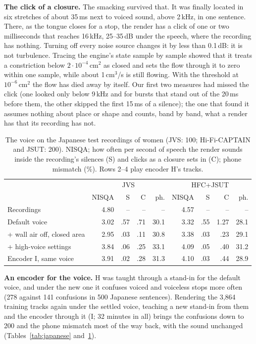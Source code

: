 \documentclass[10pt,a4paper,twocolumn]{article}
\begin{document}
\textbf{The click of a closure.} The smacking survived that. It was finally located in six
stretches of about 35\,ms next to voiced sound, above 2\,kHz, in one sentence. There, as the tongue
closes for a stop, the render has a click of one or two milliseconds that reaches 16\,kHz, 25--35\,dB
under the speech, where the recording has nothing. Turning off every noise source changes it by
less than 0.1\,dB: it is not turbulence. Tracing the engine's state sample by sample showed that
it treats a constriction below $2\cdot10^{-4}$\,cm$^2$ as closed and sets the flow through it to
zero within one sample, while about 1\,cm$^3$/s is still flowing. With the threshold at
$10^{-6}$\,cm$^2$ the flow has died away by itself. Our first two measures had missed the click
(one looked only below 9\,kHz and for bursts that stand out of the 20\,ms before them, the other
skipped the first 15\,ms of a silence); the one that found it assumes nothing about place or
shape and counts, band by band, what a render has that its recording has not.

\begin{table}[t]
\centering\scriptsize\setlength{\tabcolsep}{1.7pt}
\caption{The voice on the Japanese test recordings of women (JVS: 100; Hi-Fi-CAPTAIN and
JSUT: 200). NISQA; how often per second of speech the render sounds inside the recording's
silences (S) and clicks as a closure sets in (C); phone mismatch (\%). Rows 2--4 play encoder
H's tracks.}
\label{tab:voice}
\begin{tabular}{@{}lrrrrrrrr@{}}
\toprule
& \multicolumn{4}{c}{JVS} & \multicolumn{4}{c}{HFC+JSUT}\\
& NISQA & S & C & ph. & NISQA & S & C & ph.\\
\midrule
Recordings & 4.80 & -- & -- & -- & 4.57 & -- & -- & --\\
Default voice & 3.02 & .57 & .71 & 30.1 & 3.32 & .55 & 1.27 & 28.1\\
+ wall air off, closed area & 2.95 & .03 & .11 & 30.8 & 3.38 & .03 & .23 & 29.1\\
+ high-voice settings & 3.84 & .06 & .25 & 33.1 & 4.09 & .05 & .40 & 31.2\\
Encoder I, same voice & 3.91 & .02 & .28 & 31.3 & 4.10 & .03 & .44 & 28.9\\
\bottomrule
\end{tabular}
\end{table}

\textbf{An encoder for the voice.} H was taught through a stand-in for the default voice, and
under the new one it confuses voiced and voiceless stops more often (278 against 141 confusions in
500 Japanese sentences). Rendering the 3,864 training tracks again under the settled voice,
teaching a new stand-in from them and the encoder through it (I; 32 minutes in all) brings the
confusions down to 200 and the phone mismatch most of the way back, with the sound unchanged
(Tables~\ref{tab:japanese} and~\ref{tab:voice}).
\end{document}
